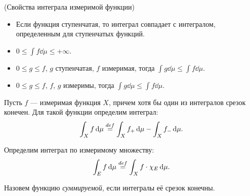 \begin{theorem}(Свойства интеграла измеримой функции)
	\enewline

	\begin{itemize}
		\item Если функция ступенчатая, то интеграл совпадает с интегралом, определенным
			для ступенчатых функций.
		\item $0 \leqslant \int{f \dd\mu} \leqslant +\infty$.
		\item $0 \leqslant g \leqslant f$, $g$ ступенчатая, $f$ измеримая, тогда
			$\int{g \dd\mu} \leqslant \int{f \dd\mu}$.
		\item $0 \leqslant g \leqslant f$, $f$, $g$ измеримы, тогда $\int{g \dd\mu} \leqslant 
            \int{f \dd\mu}$.
	\end{itemize}
\end{theorem}

\begin{definition}
	Пусть $f$ --- измеримая функция $X$, причем хотя бы один из интегралов срезок конечен.
	Для такой функции определим интеграл:
\[
	\int_X{f \,\mathrm{d}\mu} \overset{def}{\underset{}{=}} \int_X{f_+ \,\mathrm{d}\mu} - \int_X{f_- \,\mathrm{d}\mu}
.\]
\end{definition}

\begin{definition}
	Определим интеграл по измеримому множеству:
\[
	\int_E{f \,\mathrm{d}\mu} \overset{def}{\underset{}{=}} \int_X{f \cdot \chi_{E} \,\mathrm{d}\mu}
.\]
\end{definition}

\begin{definition}
	Назовем функцию \textit{суммируемой}, если интегралы её срезок конечны.
\end{definition}

